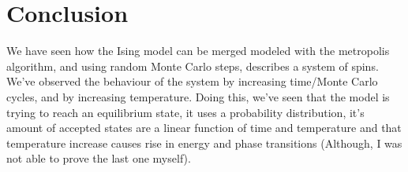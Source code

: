 \documentclass[%
oneside,                 %
final,                   %
10pt]{article}
\begin{document}
\section{Conclusion}
We have seen how the Ising model can be merged modeled with the metropolis algorithm, and using random Monte Carlo steps, describes a system of spins.
We've observed the behaviour of the system by increasing time/Monte Carlo cycles, and by increasing temperature. Doing this, we've seen that the model is trying to reach an equilibrium state,
it uses a probability distribution, it's amount of accepted states are a linear function of time and temperature and that temperature increase causes rise in energy and phase transitions (Although, 
I was not able to prove the last one myself).








\end{document}
